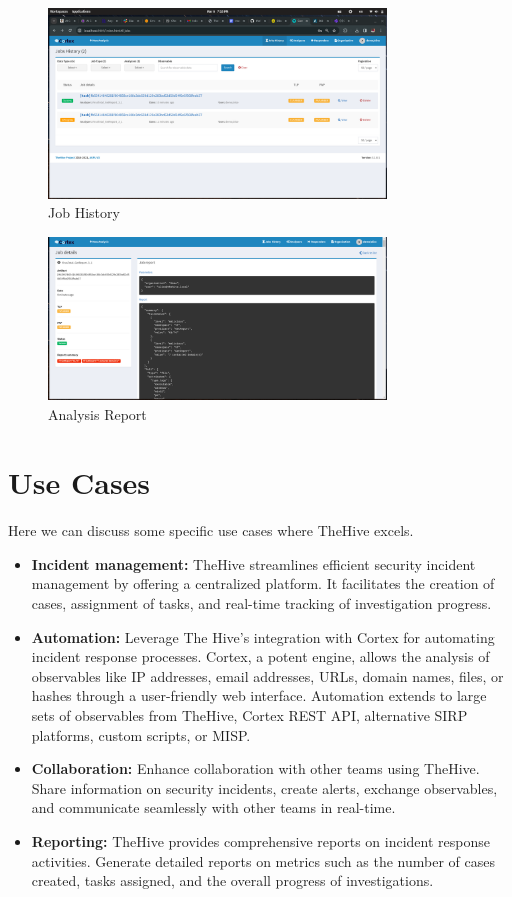 \documentclass{article}
\begin{document}
\begin{figure}[H]
    \centering
    \includegraphics[width=0.8\textwidth]{img39.png}
    \caption{Job History}
    \label{fig:job-history}
\end{figure}

\begin{figure}[H]
    \centering
    \includegraphics[width=0.8\textwidth]{img36.png}
    \caption{Analysis Report}
    \label{fig:cortex-report}
\end{figure}


\section{Use Cases}
Here we can discuss some specific use cases where TheHive excels.

\begin{itemize}
    \item \textbf{Incident management:} TheHive streamlines efficient security incident management by offering a centralized platform. It facilitates the creation of cases, assignment of tasks, and real-time tracking of investigation progress.
     \item \textbf{Automation:} Leverage The Hive's integration with Cortex for automating incident response processes. Cortex, a potent engine, allows the analysis of observables like IP addresses, email addresses, URLs, domain names, files, or hashes through a user-friendly web interface. Automation extends to large sets of observables from TheHive, Cortex REST API, alternative SIRP platforms, custom scripts, or MISP.
    \item \textbf{Collaboration:}  Enhance collaboration with other teams using TheHive. Share information on security incidents, create alerts, exchange observables, and communicate seamlessly with other teams in real-time.
    \item \textbf{Reporting:} TheHive provides comprehensive reports on incident response activities. Generate detailed reports on metrics such as the number of cases created, tasks assigned, and the overall progress of investigations.
\end{itemize}
\end{document}
